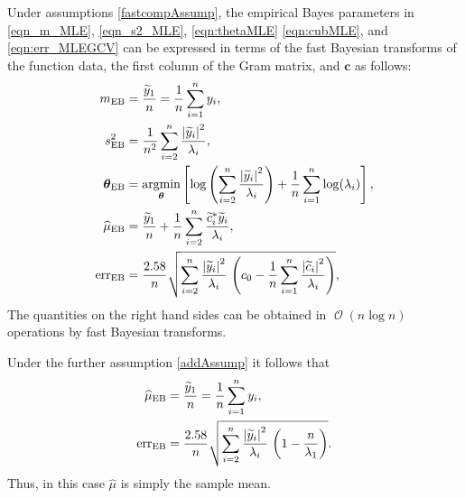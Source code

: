 \documentclass{iitthesis}          %
\DeclareMathOperator{\Order}{{\mathcal O}}
\newcommand{\bm}[1]{\boldsymbol{#1}}
\newcommand{\vtheta}{{\bm{\theta}}}
\newcommand{\vc}{\bm{c}}
\newcommand{\hmu}{\widehat{\mu}}
\newcommand{\MLE}{\textup{EB}}
\newcommand{\err}{\textup{err}}
\def\abs#1{\ensuremath{\left \lvert #1 \right \rvert}}
\providecommand{\argmin}{\operatorname*{argmin}}
\begin{document}
Under assumptions \eqref{fastcompAssump}, the empirical Bayes parameters in \eqref{eqn_m_MLE}, \eqref{eqn_s2_MLE}, \eqref{eqn:thetaMLE} \eqref{eqn:cubMLE}, and \eqref{eqn:err_MLEGCV} can be expressed in terms of the fast Bayesian transforms of the function data, the first column of the Gram matrix, and $\vc$ as follows:
\begin{align*}
\nonumber
m_\MLE &=  \frac{\widetilde{y}_1}{n} = \frac 1n \sum_{i=1}^n y_i,
\\
\nonumber
s^2_\MLE 
& =
\frac{1}{n^2} 
\sum_{i=2}^n \frac{\abs{\widetilde{y}_i}^2}{\lambda_i}, \\
\vtheta_\MLE
&= 
\argmin_{\vtheta}
\left[
\log\left(
\sum_{i=2}^n \frac{\abs{\widetilde{y}_i}^2}{\lambda_i}
\right)   + 
\frac{1}{n}\sum_{i=1}^n \log(\lambda_i)
\right],
\\
\nonumber
\hmu_\MLE  &= 
\frac{\widetilde{y}_1}{n} +
\frac 1n \sum_{i=2}^n \frac{ \widetilde{c}_i^* \widetilde{y}_i}{\lambda_i}, \\
\nonumber
\err_\MLE  &
=
\frac{2.58}{n}\sqrt{
	\sum_{i=2}^{n} \frac{\abs{\widetilde{y}_i}^2}{\lambda_i}  
	\,
	\left( c_0 - \frac 1n \sum_{i=1}^n \frac{\abs{\widetilde{c}_i}^2}{\lambda_i} \right) 
},
\end{align*}
The quantities on the right hand sides can be obtained in $\Order(n \log n)$ operations by fast Bayesian transforms. %

Under the further assumption \eqref{addAssump} it follows that 
\begin{align*}
\nonumber
\hmu_\MLE  &= 
\frac{\widetilde{y}_1}{n} = \frac 1n \sum_{i=1}^n y_i,\\
\err_\MLE  &
=
\frac{2.58}{n}\sqrt{
	\sum_{i=2}^{n} \frac{\abs{\widetilde{y}_i}^2}{\lambda_i}  
	\,
	\left( 1 -  \frac{n}{\lambda_1} \right) 
}.
\end{align*}
Thus, in this  case $\hmu$ is simply the sample mean.
\end{document}
